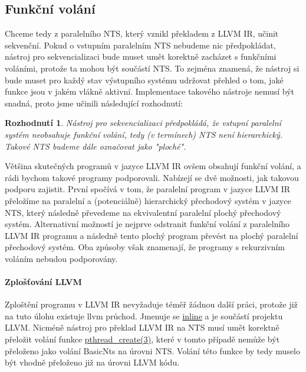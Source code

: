 \documentclass{fithesis2}
\newtheorem{decision}  {Rozhodnutí}
\begin{document}



\subsection{Funkční volání}

Chceme tedy z paralelního NTS, který vznikl překladem z LLVM IR, učinit sekvenční. Pokud o vstupním paralelním NTS nebudeme nic předpokládat, nástroj pro sekvencializaci bude muset umět korektně zacházet s funkčními voláními, protože ta mohou být součástí NTS. To zejména znamená, že nástroj si bude muset pro každý stav výstupního systému udržovat přehled o tom, jaké funkce jsou v jakém vlákně aktivní. Implementace takového nástroje nemusí být snadná, proto jsme učinili následující rozhodnutí:

\begin{decision}\label{decision:sequentialize-flat-llvm}
Nástroj pro sekvencializaci předpokládá, že vstupní paralelní systém neobsahuje funkční volání, tedy (v termínech) NTS není hierarchický. Takové NTS budeme dále označovat jako "ploché".
\end{decision}

Většina skutečných programů v jazyce LLVM IR ovšem obsahují funkční volání, a rádi bychom takové programy podporovali. Nabízejí se dvě možnosti, jak takovou podporu zajistit. První spočívá v tom, že paralelní program v jazyce LLVM IR přeložíme na paralelní a (potenciálně) hierarchický přechodový systém v jazyce NTS, který následně převedeme na ekvivalentní paralelní plochý přechodový systém. Alternativní možností je nejprve odstranit funkční volání z paralelního LLVM IR programu a následně tento plochý program převést na plochý paralelní přechodový systém. Oba způsoby však znamenají, že programy s rekurzivním voláním nebudou podporovány.

\paragraph{Zplošťování LLVM}
Zploštění programu v LLVM IR nevyžaduje téměř žádnou další práci, protože již na tuto úlohu existuje llvm průchod. Jmenuje se
\href{http://llvm.org/docs/Passes.html#inline-function-integration-inlining}
{inline} a je součástí projektu LLVM. Nicméně nástroj pro překlad LLVM IR na NTS musí umět korektně přeložit volání funkce
\href{http://man7.org/linux/man-pages/man3/pthread\_create.3.html}
{pthread\_create(3)}, které v tomto případě nemůže být přeloženo jako volání BasicNts na úrovni NTS. Volání této funkce by tedy muselo být vhodně přeloženo již na úrovni LLVM kódu.
\end{document}
